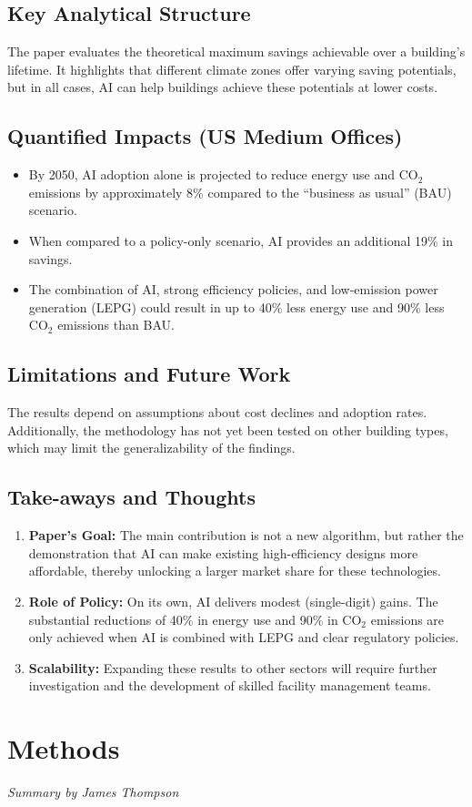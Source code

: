 \documentclass[conference,a4paper]{IEEEtran}
\begin{document}
\subsection*{Key Analytical Structure}
The paper evaluates the theoretical maximum savings achievable over a building’s lifetime. It highlights that different climate zones offer varying saving potentials, but in all cases, AI can help buildings achieve these potentials at lower costs.

\subsection*{Quantified Impacts (US Medium Offices)}
\begin{itemize}
    \item By 2050, AI adoption alone is projected to reduce energy use and CO$_2$ emissions by approximately 8\% compared to the “business as usual” (BAU) scenario.
    \item When compared to a policy-only scenario, AI provides an additional 19\% in savings.
    \item The combination of AI, strong efficiency policies, and low-emission power generation (LEPG) could result in up to 40\% less energy use and 90\% less CO$_2$ emissions than BAU.
\end{itemize}

\subsection*{Limitations and Future Work}
The results depend on assumptions about cost declines and adoption rates. Additionally, the methodology has not yet been tested on other building types, which may limit the generalizability of the findings.

\subsection*{Take-aways and Thoughts}
\begin{enumerate}
    \item \textbf{Paper’s Goal:} The main contribution is not a new algorithm, but rather the demonstration that AI can make existing high-efficiency designs more affordable, thereby unlocking a larger market share for these technologies.
    \item \textbf{Role of Policy:} On its own, AI delivers modest (single-digit) gains. The substantial reductions of 40\% in energy use and 90\% in CO$_2$ emissions are only achieved when AI is combined with LEPG and clear regulatory policies.
    \item \textbf{Scalability:} Expanding these results to other sectors will require further investigation and the development of skilled facility management teams.
\end{enumerate}

\section*{Methods}
\textit{Summary by James Thompson}





\appendix
\end{document}
